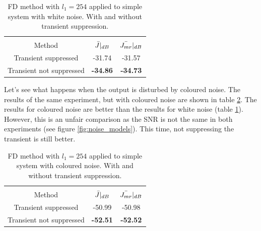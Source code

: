 \begin{table}[H]
\centering
\begin{tabular}{|ccc|}
\hline
&&\\[-2.5ex]
Method & $\Bar{J}|_{dB}$ & $\Bar{J_{mr}}|_{dB}$ \\
\hline
Transient suppressed & -31.74 & -31.57\\
Transient not suppressed & \textbf{-34.86} & \textbf{-34.73}\\
\hline
\end{tabular}
\caption{FD method with $l_1= 254$ applied to simple system with white noise. With and without transient suppression.}
\label{tab:simple_flat_FD_transient_with_without}
\end{table}

\newpage
Let's see what happens when the output is disturbed by coloured noise. The results of the same experiment, but with coloured noise are shown in table \ref{tab:simple_cololoured_FD_transient_with_without}. The results for coloured noise are better than the results for white noise (table \ref{tab:simple_flat_FD_transient_with_without}). However, this is an unfair comparison as the SNR is not the same in both experiments (see figure \ref{fig:noise_models}). This time, not suppressing the transient is still better.

\begin{table}[H]
\centering
\begin{tabular}{|ccc|}
\hline
&&\\[-2.5ex]
Method & $\Bar{J}|_{dB}$ & $\Bar{J_{mr}}|_{dB}$ \\
\hline
Transient suppressed & -50.99 &-50.98\\
Transient not suppressed & \textbf{-52.51} & \textbf{-52.52}\\
\hline
\end{tabular}
\caption{FD method with $l_1= 254$ applied to simple system with coloured noise. With and without transient suppression.}
\label{tab:simple_cololoured_FD_transient_with_without}
\end{table}


